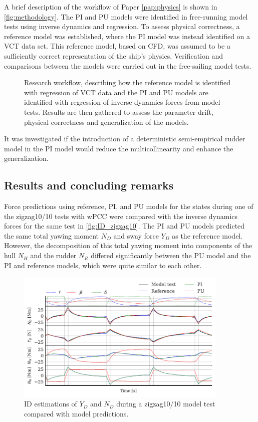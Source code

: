 A brief description of the workflow of Paper \ref{pap:physics} is shown in \autoref{fig:methodology}.
The PI and PU models were identified in free-running model tests using inverse dynamics and regression. To assess physical correctness, a reference model was established, where the PI model was instead identified on a VCT data set. This reference model, based on CFD, was assumed to be a sufficiently correct representation of the ship's physics.
Verification and comparisons between the models were carried out in the free-sailing model tests.
\begin{figure}[h]
  \centering
  
  \caption{Research workflow, describing how the reference model is identified with regression of VCT data and the PI and PU models are identified with regression of inverse dynamics forces from model tests. Results are then gathered to assess the parameter drift, physical correctness and generalization of the models.}
  \label{fig:methodology}
\end{figure}
It was investigated if the introduction of a deterministic semi-empirical rudder model in the PI model would reduce the multicollinearity and enhance the generalization.

\FloatBarrier
\clearpage
\subsection*{Results and concluding remarks}
Force predictions using reference, PI, and PU models for the states during one of the zigzag10/10 tests with wPCC were compared with the inverse dynamics forces for the same test in \autoref{fig:ID_zigzag10}. The PI and PU models predicted the same total yawing moment $N_D$ and sway force $Y_D$ as the reference model. However, the decomposition of this total yawing moment into components of the hull $N_H$ and the rudder $N_R$ differed significantly between the PU model and the PI and reference models, which were quite similar to each other.

\begin{figure}[h] \centering \includegraphics[width=0.9\textwidth]{kappa/images/results.ID_zigzag10.pdf} \caption{ID estimations of $Y_D$ and $N_D$ during a zigzag10/10 model test compared with model predictions.} \label{fig:ID_zigzag10} \end{figure}

